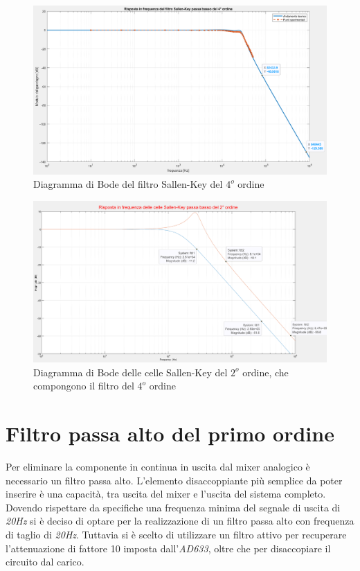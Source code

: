 \documentclass[titlepage]{report}
\begin{document}
	\begin{figure}[H]
		\centering
		\includegraphics[scale=0.48]{Immagini/bode_lp4.png}
		\caption{Diagramma di Bode del filtro Sallen-Key del $4^o$ ordine}
		\label{fig:BODELp4Real}
	\end{figure}

	\begin{figure}[H]
		\centering
		\includegraphics[scale=0.48]{Immagini/bode_lp2_tag.png}
		\caption{Diagramma di Bode delle celle Sallen-Key del $2^o$ ordine, che compongono il filtro del $4^o$ ordine}
		\label{fig:BODELp4Realzoom}
	\end{figure}
	

\newpage
\section{Filtro passa alto del primo ordine}
\label{sec:filtro_hp1}
	Per eliminare la componente in continua in uscita dal mixer analogico è necessario un filtro passa alto. L'elemento disaccoppiante più semplice da poter inserire è una capacità, tra uscita del mixer e l'uscita del sistema completo.
	Dovendo rispettare da specifiche una frequenza minima del segnale di uscita di \textit{20Hz} si è deciso di optare per la realizzazione di un filtro passa alto con frequenza di taglio di \textit{20Hz}. Tuttavia si è scelto di utilizzare un filtro attivo per recuperare l'attenuazione di fattore 10 imposta dall'\textit{AD633}, oltre che per disaccopiare il circuito dal carico.
	
\end{document}
